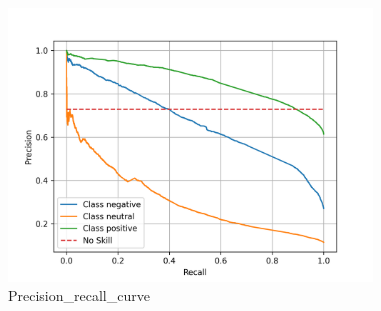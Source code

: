 \documentclass{article}%
\begin{document}
{%
\newpage%
\raggedright%


\begin{figure}[h!]%
\centering%
\includegraphics[width=365px]{./report/Learning/Gradient_Boosting/Recall-Precision.png}%
\caption{Precision\_recall\_curve}%
\end{figure}

%
}%
\pagestyle{firstpage}%
\newpage%
\end{document}
